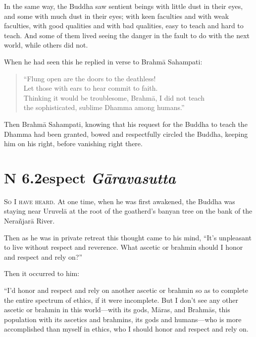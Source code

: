 \documentclass[12pt,openany]{book}%
\newcommand*{\suttatitleacronym}[1]{\smaller[2]{#1}\vspace*{.3em}}
\newcommand*{\suttatitletranslation}[1]{\linebreak{#1}}
\newcommand*{\suttatitleroot}[1]{\linebreak\smaller[2]\itshape{#1}}
\newcommand*{\tocacronym}[1]{\hspace*{-3.3em}{#1}\quad}
\newcommand*{\toctranslation}[1]{#1}
\newcommand*{\tocroot}[1]{(\textit{#1})}
\newcommand*{\scevam}[1]{\textsc{#1}}
\begin{document}
In the same way, the Buddha saw sentient beings with little dust in their eyes, and some with much dust in their eyes; with keen faculties and with weak faculties, with good qualities and with bad qualities, easy to teach and hard to teach. And some of them lived seeing the danger in the fault to do with the next world, while others did not. 

When he had seen this he replied in verse to \textsanskrit{Brahmā} Sahampati: 

\begin{verse}%
“Flung open are the doors to the deathless! \\
Let those with ears to hear commit to faith. \\
Thinking it would be troublesome, \textsanskrit{Brahmā}, I did not teach \\
the sophisticated, sublime Dhamma among humans.” 

%
\end{verse}

Then \textsanskrit{Brahmā} Sahampati, knowing that his request for the Buddha to teach the Dhamma had been granted, bowed and respectfully circled the Buddha, keeping him on his right, before vanishing right there. 

%
\section*{{\suttatitleacronym SN 6.2}{\suttatitletranslation Respect }{\suttatitleroot Gāravasutta}}
\addcontentsline{toc}{section}{\tocacronym{SN 6.2} \toctranslation{Respect } \tocroot{Gāravasutta}}

\scevam{So I have heard. }At one time, when he was first awakened, the Buddha was staying near \textsanskrit{Uruvelā} at the root of the goatherd’s banyan tree on the bank of the \textsanskrit{Nerañjarā} River. 

Then as he was in private retreat this thought came to his mind, “It’s unpleasant to live without respect and reverence. What ascetic or brahmin should I honor and respect and rely on?” 

Then it occurred to him: 

“I’d honor and respect and rely on another ascetic or brahmin so as to complete the entire spectrum of ethics, if it were incomplete. But I don’t see any other ascetic or brahmin in this world—with its gods, \textsanskrit{Māras}, and \textsanskrit{Brahmās}, this population with its ascetics and brahmins, its gods and humans—who is more accomplished than myself in ethics, who I should honor and respect and rely on. 
\end{document}
